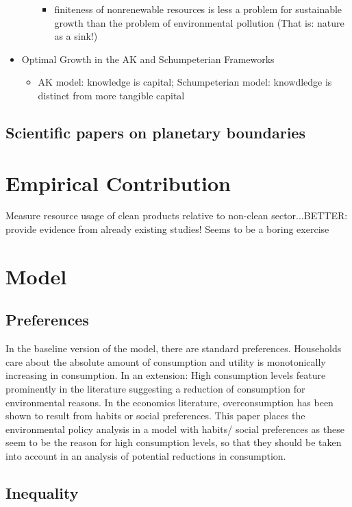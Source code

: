 \documentclass[12pt]{article}
\begin{document}
\begin{itemize}
\begin{itemize}
\begin{itemize}
\item finiteness of nonrenewable resources is less a problem for sustainable growth than the problem of environmental pollution (That is: nature as a sink!)
\end{itemize}
\end{itemize}
\item Optimal Growth in the AK and Schumpeterian Frameworks \citep[Chapter 5,][]{EndGrowthAghion1998}
\begin{itemize}
\item AK model: knowledge is capital; Schumpeterian model: knowdledge is distinct from more tangible capital 
\end{itemize}
\end{itemize}

\subsection{Scientific papers on planetary boundaries}


\section{Empirical Contribution}
Measure resource usage of clean products relative to non-clean sector...BETTER: provide evidence from already existing studies! Seems to be a boring exercise


\section{Model}
\subsection{Preferences}
In the baseline version of the model, there are standard preferences. Households care about the absolute amount of consumption and utility is monotonically increasing in consumption. 
In an extension: 
High consumption levels feature prominently in the literature suggesting a reduction of consumption for environmental reasons. In the economics literature, overconsumption has been shown to result from habits or social preferences. This paper places the environmental policy analysis in a model with habits/ social preferences as these seem to be the reason for high consumption levels, so that they should be taken into account in an analysis of potential reductions in consumption. 

\subsection{Inequality}
\end{document}
